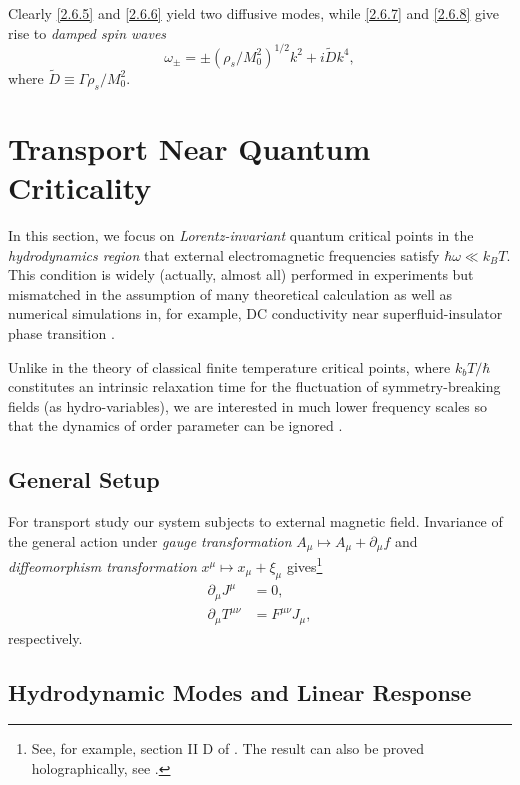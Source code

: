 \documentclass[10pt,nofootinbib,letterpaper]{revtex4}
\begin{document}
		Clearly \eqref{2.6.5} and \eqref{2.6.6} yield two diffusive modes, while \eqref{2.6.7} and \eqref{2.6.8} give rise to \emph{damped spin waves}
		\begin{equation}\label{2.6.9}
			\omega_\pm=\pm(\rho_s/M_0^2)^{1/2}k^2+i \widetilde{D}k^4, 
		\end{equation}
		where $\widetilde{D}\equiv\Gamma\rho_s/M_0^2$.


\section{Transport Near Quantum Criticality}
	In this section, we focus on \emph{Lorentz-invariant} quantum critical points in the \emph{hydrodynamics region} that external electromagnetic frequencies satisfy $\hbar\omega\ll k_B T$. This condition is widely (actually, almost all) performed in experiments but mismatched in the assumption of many theoretical calculation as well as numerical simulations in, for example, DC conductivity near superfluid-insulator phase transition \cite{damle1997nonzero}.\par
	Unlike in the theory of classical finite temperature critical points, where $k_bT/\hbar$ constitutes an intrinsic relaxation time for the fluctuation of symmetry-breaking fields (as hydro-variables), we are interested in much lower frequency scales so that the dynamics of order parameter can be ignored \cite{hartnoll2007theory}.

	\subsection{General Setup}
		For transport study our system subjects to external magnetic field. Invariance of the general action under \emph{gauge transformation} $A_\mu\mapsto A_\mu+\partial_\mu f$ and \emph{diffeomorphism transformation} $x^\mu\mapsto x_\mu+\xi_\mu$ gives\footnote{See, for example, section II D of \cite{herzog2009lectures}. The result can also be proved holographically, see \cite{lindgren2015holographic}.}
		\begin{align}\label{5.1.1}
			\partial_\mu J^\mu&=0,\\
			\partial_\mu T^{\mu\nu}&=F^{\mu\nu}J_\mu,
		\end{align}
		respectively.
		
	\subsection{Hydrodynamic Modes and Linear Response}
\end{document}
